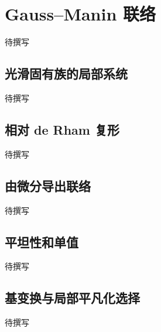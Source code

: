 
% 
% 

\section{Gauss–Manin 联络}
\label{g4:sec:3202}

待撰写

\subsection{光滑固有族的局部系统}
\label{g4:subsec:3202:01}
待撰写

\subsection{相对 de Rham 复形}
\label{g4:subsec:3202:02}
待撰写

\subsection{由微分导出联络}
\label{g4:subsec:3202:03}
待撰写

\subsection{平坦性和单值}
\label{g4:subsec:3202:04}
待撰写

\subsection{基变换与局部平凡化选择}
\label{g4:subsec:3202:05}
待撰写
